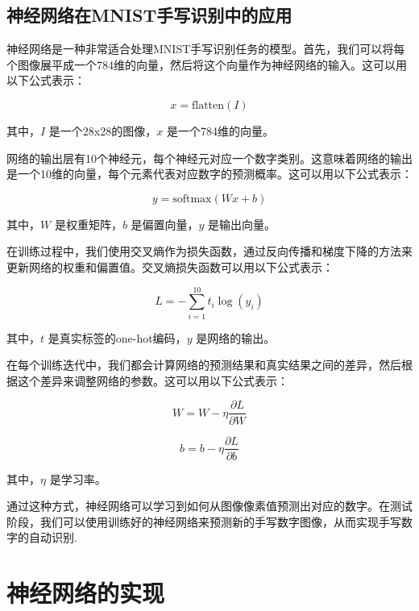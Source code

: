 \documentclass{ctexart}
\begin{document}
    \subsection{神经网络在MNIST手写识别中的应用}
    神经网络是一种非常适合处理MNIST手写识别任务的模型。首先，我们可以将每个图像展平成一个784维的向量，然后将这个向量作为神经网络的输入。这可以用以下公式表示：

    \begin{equation}
    x = \text{flatten}(I)
    \end{equation}

    其中，$I$ 是一个28x28的图像，$x$ 是一个784维的向量。

    网络的输出层有10个神经元，每个神经元对应一个数字类别。这意味着网络的输出是一个10维的向量，每个元素代表对应数字的预测概率。这可以用以下公式表示：

    \begin{equation}
    y = \text{softmax}(Wx + b)
    \end{equation}

    其中，$W$ 是权重矩阵，$b$ 是偏置向量，$y$ 是输出向量。

    在训练过程中，我们使用交叉熵作为损失函数，通过反向传播和梯度下降的方法来更新网络的权重和偏置值。交叉熵损失函数可以用以下公式表示：

    \begin{equation}
    L = -\sum_{i=1}^{10} t_i \log(y_i)
    \end{equation}

    其中，$t$ 是真实标签的one-hot编码，$y$ 是网络的输出。

    在每个训练迭代中，我们都会计算网络的预测结果和真实结果之间的差异，然后根据这个差异来调整网络的参数。这可以用以下公式表示：

    \begin{equation}
    W = W - \eta \frac{\partial L}{\partial W}
    \end{equation}

    \begin{equation}
    b = b - \eta \frac{\partial L}{\partial b}
    \end{equation}

    其中，$\eta$ 是学习率。

    通过这种方式，神经网络可以学习到如何从图像像素值预测出对应的数字。在测试阶段，我们可以使用训练好的神经网络来预测新的手写数字图像，从而实现手写数字的自动识别\cite{LeCun1998}.
\section{神经网络的实现}
\end{document}
